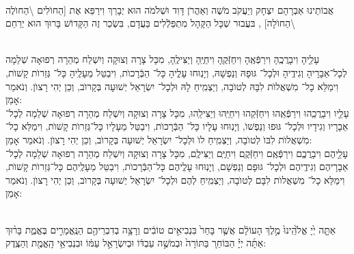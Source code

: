 \documentclass[twoside, openany, parskip=half, 11pt]{book}
\begin{document}
\begin{sometimes}
\\
 אֲבוֹתֵינוּ אַבְרָהָם יִצְחָק וְיַעֲקֹב מֹשֶׁה וְאַהֲרֹן דָּוִד וּשְׁלֹמֹה הוּא יְבָרֵךְ וִירַפֵּא אֶת [הַחוׂלִים \textbackslash הַחוׂלֶה \textbackslash הַחוׂלָה]
,
בּעֲבוּר שְׁכָּל הַקָּהָל מִתְפַּלְֿלִים בַּעֲדָם, בִּשְׂכַר זֶה
 הַקָּדוֹשׁ בָּרוּךְ הוּא יְרַחֵם 
\setcolumnwidth{1.4in,1.4in,1.4in}
 \begin{paracol}{3}
 \\
  עָלֵָיהָ וִיבָרֲכֶֽהָ וִירַפְּֿאֶֽהָ וִיחַזְּֿקֶֽהָ וִיחַיֶּֽהָ וְיַצִּילֶֽהָ,  מִכָּל צָרָה וְצוּקָה וְיִשְׁלַח מְהֵרָה רְפוּאָה שְׁלֵמָה לְכָל־אֵבָרָיהָ וְגִידֶֽיהָ וּלְכָל־ גּוּפָהּ וְנַפְשָׁהּ, וְיָנֽוּחוּ עָלְֶיהָ כָּל־ הַבְּֿרָכוׂת, וִיבַטֵּל מֵעָלֶֽיהָ כָּל־ גְּזֵרוׂת קָשׁוׂת, וִימַלֵּא כָל־ מִשְׁאֲלוׂת לִבָּהּ לְטוׂבָה, וְיַצְמִֽיחַ לָהּ וּלְכָל־ יִשְׂרָאֵל יְשׁוּעָה בְּקָרוׂב, וְכֵן יְהִי רָצוׂן. וְנֹאמַר אָמֵן:
  \switchcolumn
   \\
עָלֵָיו וִיבָרֲכֵֽהוּ וִירַפְּֿאֵֽהוּ וִיחַזְּֿקֵהוּ וִיחַיֵּֽהוּ וְיַצִּילֵֽהוּ, מִכָּל צָרָה וְצוּקָה וְיִשְׁלַח מְהֵרָה רְפוּאָה שְׁלֵמָה לְכָל־ אֵבָרָיו וְגִידָיו וּלְכָל־ גּוּפוּ וְנַפְשׁוׂ, וְיָנֽוּחוּ עָלָיו כָּל־ הַבְּֿרָכוׂת, וִיבַטֵּל מֵעָלָיו כָּל־גְּזֵרוׂת קָשׁוׂת, וִימַלֵּא כָל־ מִשְׁאֲלוׂת לִבּוׂ לְטוׂבָה, וְיַצְמִֽיחַ לוׂ וּלְכָל־ יִשְׂרָאֵל יְשׁוּעָה בְּקָרוׂב, וְכֵן יְהִי רָצוׂן. וְנֹאמַר אָמֵן:
  \switchcolumn
   \\
 עָלֵָיהֶם וִיבָרֲכְֶם וִירַפְּֿאֶֽם וִיחַזְּֿקֶֽם וִיחַיֶּֽם וְיַצִּילֶֽם, מִכָּל צָרָה וְצוּקָה וְיִשְׁלַח מְהֵרָה רְפוּאָה שְׁלֵמָה לְכָל־ אֵבָרָיהֶם וְגִידֶֽיהֶם וּלְכָל־ גּוּפָם וְנַפְשָׁם, וְיָנֽוּחוּ עָלְֶיהֶם כָּל־הַבְּֿרָכוׂת, וִיבַטֵּל מֵעָלֶֽיהֶם כָּל־גְּזֵרוׂת קָשׁוׂת, וִימַלֵּא כָל־ מִשְׁאֲלוׂת לִבָּם לְטוׂבָה, וְיַצְמִֽיחַ לְהֶם וּלְכָל־ יִשְׂרָאֵל יְשׁוּעָה בְּקָרוׂב, וְכֵן יְהִי רָצוׂן. וְנֹאמַר אָמֵן:
 \end{paracol}

\end{sometimes}

\halfkaddish

\hagbaha

\galila


\\
 אַתָּ֤ה יְ֙יָ אֱלֹ֙הֵֽינוּ֙ מֶ֣לֶךְ הָעוֹלָ֔ם אֲשֶׁ֤ר בָּחַר֙ בִּנְבִיאִ֣ים טוֹבִ֔ים וְרָצָ֥ה בְדִבְרֵיהֶ֖ם הַנֶּֽאֱמָרִ֣ים בֶּאֱמֶ֑ת בָּר֨וּךְ אַתָּ֜ה יְיָ֗ הַבּוֹחֵר֚ בַּתּוֹרָה֙ וּבְמֹשֶׁ֣ה עַבְדּ֔וֹ וּבְיִשְׂרָאֵ֣ל עַמּ֔וֹ וּבִנְבִיאֵ֥י הָֽאֱמֶ֖ת וְהַצֶֽדֶק:
\end{document}
